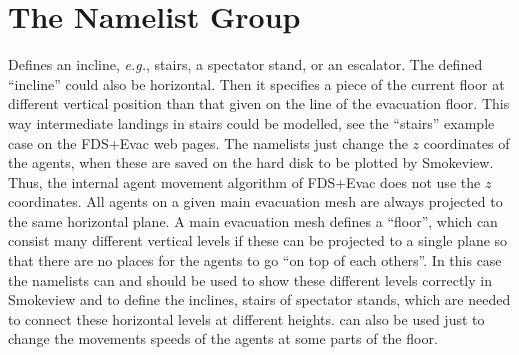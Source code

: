 \documentclass[12pt,a4paper,final,twoside]{stylevk}
\begin{document}
\section{The  Namelist Group}\label{Sec_EvssNML}

\noindent Defines an incline, \emph{e.g.}, stairs, a spectator stand,
or an escalator.  The defined ``incline'' could also be horizontal.
Then it specifies a piece of the current floor at different vertical
position than that given on the  line of the evacuation floor.
This way intermediate landings in stairs could be modelled, see the
``stairs'' example case on the FDS+Evac web pages.  The 
namelists just change the $z$ coordinates of the agents, when these
are saved on the hard disk to be plotted by Smokeview.  Thus, the
internal agent movement algorithm of FDS+Evac does not use the $z$
coordinates.  All agents on a given main evacuation mesh are always
projected to the same horizontal plane.  A main evacuation mesh
defines a ``floor'', which can consist many different vertical levels
if these can be projected to a single plane so that there are no
places for the agents to go ``on top of each others''.  In this case
the  namelists can and should be used to show these
different levels correctly in Smokeview and to define the inclines,
stairs of spectator stands, which are needed to connect these
horizontal levels at different heights.   can also be used
just to change the movements speeds of the agents at some parts of the
floor.
\end{document}
